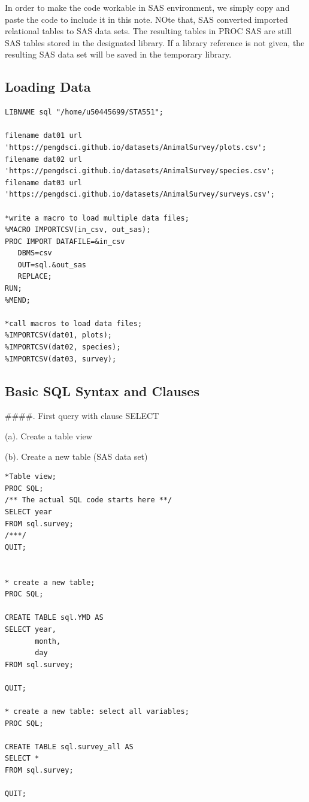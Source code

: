 \documentclass[
]{book}
\begin{document}
In order to make the code workable in SAS environment, we simply copy and paste the code to include it in this note. NOte that, SAS converted imported relational tables to SAS data sets. The resulting tables in PROC SAS are still SAS tables stored in the designated library. If a library reference is not given, the resulting SAS data set will be saved in the temporary library.

\hypertarget{loading-data}{%
\subsection{Loading Data}\label{loading-data}}

\begin{verbatim}
LIBNAME sql "/home/u50445699/STA551";

filename dat01 url 'https://pengdsci.github.io/datasets/AnimalSurvey/plots.csv';
filename dat02 url 'https://pengdsci.github.io/datasets/AnimalSurvey/species.csv';
filename dat03 url 'https://pengdsci.github.io/datasets/AnimalSurvey/surveys.csv';

*write a macro to load multiple data files;
%MACRO IMPORTCSV(in_csv, out_sas);
PROC IMPORT DATAFILE=&in_csv 
   DBMS=csv 
   OUT=sql.&out_sas 
   REPLACE;
RUN;
%MEND;

*call macros to load data files;
%IMPORTCSV(dat01, plots);
%IMPORTCSV(dat02, species);
%IMPORTCSV(dat03, survey);
\end{verbatim}

\hypertarget{basic-sql-syntax-and-clauses}{%
\subsection{Basic SQL Syntax and Clauses}\label{basic-sql-syntax-and-clauses}}

\#\#\#\#. First query with clause SELECT

(a). Create a table view

(b). Create a new table (SAS data set)

\begin{verbatim}
*Table view;   
PROC SQL;
/** The actual SQL code starts here **/
SELECT year
FROM sql.survey;
/***/
QUIT;


* create a new table;
PROC SQL;

CREATE TABLE sql.YMD AS
SELECT year, 
       month, 
       day
FROM sql.survey;

QUIT;

* create a new table: select all variables;
PROC SQL;

CREATE TABLE sql.survey_all AS
SELECT *
FROM sql.survey;

QUIT;
\end{verbatim}
\end{document}
